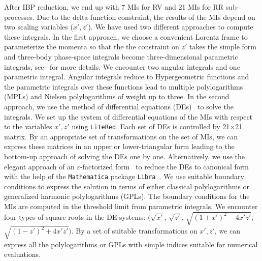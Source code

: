 \documentclass[%
 twocolumn,
 superscriptaddress,
 preprintnumbers,
 nofootinbib,
 amsmath,amssymb,
 aps,
 prl,
]{revtex4}
\begin{document}
{After IBP reduction, we end up with 7 MIs for RV and 21 MIs for RR sub-processes.  
Due to the delta function constraint,
the results of the MIs depend on two scaling variables ($x', z'$). 
We have used two different approaches to compute these integrals.  
In the first approach, we choose a convenient Lorentz frame to parameterize the momenta so that the 
the constraint on $z'$ takes the simple form and three-body phase-space integrals become three-dimensional parametric integrals, see~\cite{Matsuura:1988sm,Zijlstra:1992qd,Rijken:1996ns,Ravindran:2003um} 
for more details.  
We encounter two angular integrals and one parametric integral. 
Angular integrals reduce to
Hypergeometric functions and the parametric integrals over these functions lead to multiple polylogarithms (MPLs) and Nielsen polylogarithms of weight up to three. 
%
In the second approach, we use the method of differential equations (DEs)~\cite{Kotikov:1990kg,Argeri:2007up,Remiddi:1997ny,Henn:2013pwa,Ablinger:2015tua} to solve the integrals.
We set up the system of differential equations of the MIs with respect to the variables 
$x',z'$ using \texttt{LiteRed}. 
Each set of DEs is controlled by  21$\times$21 matrix. 
By an appropriate set of transformations on the set of MIs, we can
express these matrices in an upper or lower-triangular form
leading to the bottom-up approach of solving the DEs one by one. 
Alternatively, we use the elegant approach of an $\varepsilon$-factorized form~\cite{Henn:2013pwa} to reduce the DEs to canonical form with the help of the \texttt{Mathematica} package \texttt{Libra}~\cite{Lee:2020zfb}.
We use suitable boundary conditions to express the solution in terms of either classical polylogarithms or generalized harmonic polylogarithms (GPLs).
The boundary conditions for the MIs are computed in the threshold limit from parametric integrals.
We encounter four types of square-roots in the DE systems: $\big(\sqrt{x'}$, $\sqrt{z'}$, $\sqrt{(1+x')^2-4x'z'}$, $\sqrt{(1-z')^2+4x'z'}\big)$.
By a set of suitable transformations on $x',z'$,
we can express all the polylogarithms or GPLs
with simple indices suitable for numerical evaluations.


}
\end{document}
